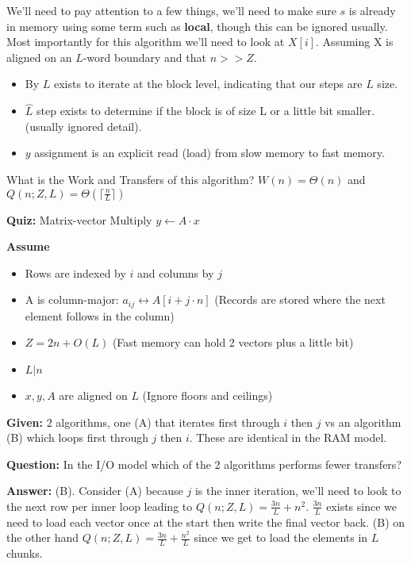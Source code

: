 \documentclass{amsart}
\begin{document}
	We'll need to pay attention to a few things, we'll need to make sure $s$ is already in memory using some term such as \textbf{local}, though this can be ignored usually. Most importantly for this algorithm we'll need to look at $X[i]$. Assuming X is aligned on an $L$-word boundary and that $n >> Z$.
	\begin{itemize}
		\item By $L$ exists to iterate at the block level, indicating that our steps are $L$ size.
		\item $\hat{L}$ step exists to determine if the block is of size L or a little bit smaller. (usually ignored detail).
		\item $y$ assignment is an explicit read (load) from slow memory to fast memory.
	\end{itemize}
	What is the Work and Transfers of this algorithm? $W(n) = \Theta(n)$ and $Q(n;Z,L)  = \Theta(\lceil\frac{n}{L}\rceil)$
	\begin{mdframed}[style=Quiz]
		\textbf{Quiz: } Matrix-vector Multiply $y \gets A \cdot x$
		
		\noindent
		\textbf{Assume}
		\begin{itemize}
			\item Rows are indexed by $i$ and columns by $j$
			\item A is column-major: $a_{ij} \leftrightarrow A[i + j \cdot n]$ (Records are stored where the next element follows in the column)
			\item $Z = 2n + O(L)$ (Fast memory can hold 2 vectors plus a little bit)
			\item $L | n$
			\item $x,y,A$ are aligned on $L$ (Ignore floors and ceilings)
		\end{itemize}
		
		\noindent
		\textbf{Given:} 2 algorithms, one (A) that iterates first through $i$ then $j$ vs an algorithm (B) which loops first through $j$ then $i$. These are identical in the RAM model.
		
		\noindent
		\textbf{Question:} In the I/O model which of the 2 algorithms performs fewer transfers?
		
		\noindent
		\textbf{Answer:} (B). Consider (A) because $j$ is the inner iteration, we'll need to look to the next row per inner loop leading to $Q(n;Z,L)  = \frac{3n}{L} + n^2$. $\frac{3n}{L}$ exists since we need to load each vector once at the start then write the final vector back. (B) on the other hand $Q(n;Z,L)  = \frac{3n}{L} + \frac{n^2}{L}$ since we get to load the elements in $L$ chunks.
	\end{mdframed}
\end{document}
